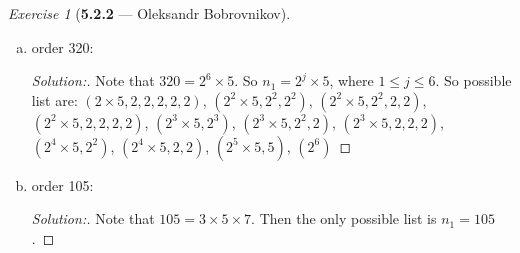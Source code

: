 \documentclass[12pt]{amsart}
\theoremstyle{remark}
\newtheorem*{exercise}{Exercise}%
\theoremstyle{mycomment}
\begin{document}
\begin{exercise}[\textbf{5.2.2} --- Oleksandr Bobrovnikov]
\begin{enumerate}[(a)]
\begin{proof}[Solution:]
      And finally if $n_1=9801$, then this is the entire list.
    \end{proof}
    \item order 320:
    \begin{proof}[Solution:]
      Note that $320 = 2^6\times 5$. So $n_1=2^j\times 5$, where $1\leq j\leq 6$. So possible list are:
      $\left( 2\times 5,2,2,2,2,2 \right)$, $\left( 2^2\times 5, 2^2,2^2 \right)$, $\left( 2^2\times 5,2^2,2,2 \right)$,
      $(2^2\times 5,2,2,2,2)$, $(2^3\times 5,2^3)$, $(2^3\times 5, 2^2,2)$, $(2^3\times 5, 2,2,2)$, $(2^4\times 5,2^2)$, $(2^4\times 5,2,2)$, $(2^5\times 5,5)$, $(2^6)$
    \end{proof}
    \item order 105:
    \begin{proof}[Solution:]
      Note that $105=3\times 5\times 7$. Then the only possible list is $n_1=105$.
    \end{proof}
  \end{enumerate}
\end{exercise}
\vspace{.15in}
\end{document}
